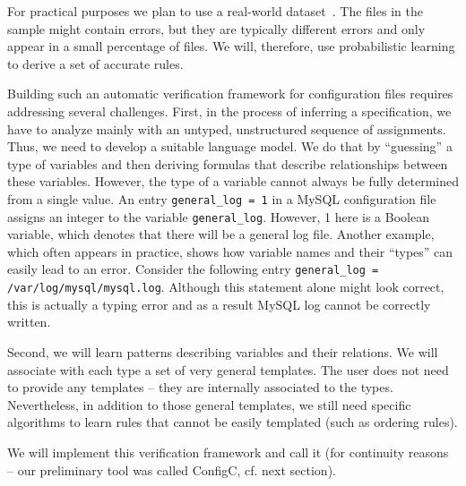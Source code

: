 For practical purposes we plan to use a real-world dataset~\cite{configdataset}. The 
files in the sample might contain
errors, but they are typically different errors and only appear in a small percentage of 
files. We will, therefore, use probabilistic learning to derive a set of accurate rules. 

Building such an automatic verification framework for
configuration files requires addressing several challenges. 
First, in the process of inferring a specification, we have to 
analyze mainly with an untyped, unstructured sequence of assignments.
Thus, we need to develop a suitable language model. We do that by 
``guessing'' a type of variables and then deriving formulas that
describe relationships between these variables. However, the
type of a variable cannot always be fully determined 
from a single value. 
An entry {\tt general\_log = 1} in a MySQL configuration file assigns an integer to the 
variable {\tt general\_log}. However, 1 here is a Boolean variable,
which denotes that there will be a general log file.
Another example, which often appears in practice, shows how variable names and 
their ``types'' can easily lead to an error. Consider the
following entry {\tt general\_log = /var/log/mysql/mysql.log}. Although this statement 
alone might look correct, this is actually a typing error and as a result MySQL log cannot be correctly written.

Second, we will learn patterns describing variables and their relations. We will associate with each type a set of very general templates. The user does not need to provide any templates -- they are internally associated to the types.
Nevertheless, in addition to those general templates, we still need specific algorithms to learn
rules that cannot be easily templated (such as ordering rules). 

We will implement this verification framework and call it \app (for continuity reasons
-- our preliminary tool was called ConfigC, cf. next section).
